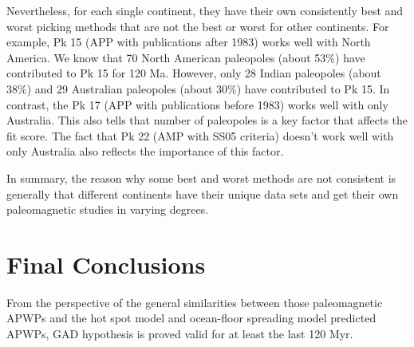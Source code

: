 Nevertheless, for each single continent, they have their own consistently best
and worst picking methods that are not the best or worst for other continents.
For example, Pk 15 (APP with publications after 1983) works well with North
America. We know that 70 North American paleopoles (about 53\%) have contributed
to Pk 15 for 120 Ma. However, only 28 Indian paleopoles (about 38\%)
and 29 Australian paleopoles (about 30\%) have contributed to Pk 15. In
contrast, the Pk 17 (APP with publications before 1983) works well with only
Australia. This also tells that number of paleopoles is a key factor that
affects the fit score. The fact that Pk 22 (AMP with SS05 criteria) doesn't work
well with only Australia also reflects the importance of this factor.

In summary, the reason why some best and worst methods are not consistent is
generally that different continents have their unique data sets and get their
own paleomagnetic studies in varying degrees.


\section{Final Conclusions}

From the perspective of the general similarities between those paleomagnetic
APWPs and the hot spot model and ocean-floor spreading model predicted APWPs,
GAD hypothesis is proved valid for at least the last 120 Myr.

